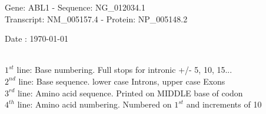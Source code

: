 \documentclass{article}
\begin{document}
\renewcommand{\footrulewidth}{1pt}
\renewcommand{\headrulewidth}{0pt}
\begin{center}
\begin{large}
Gene: ABL1 - Sequence: NG\_012034.1\\
Transcript: NM\_005157.4 - Protein: NP\_005148.2
 
 Date : \today\\\\
\end{large}
\end{center}
$1^{st}$ line: Base numbering. Full stops for intronic +/- 5, 10, 15...\\
$2^{nd}$ line: Base sequence. lower case Introns, upper case Exons\\
$3^{rd}$ line: Amino acid sequence. Printed on MIDDLE base of codon\\
$4^{th}$ line: Amino acid numbering. Numbered on $1^{st}$ and increments of 10\\
\end{document}
